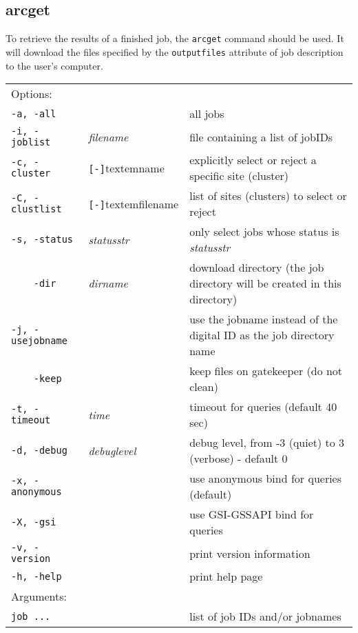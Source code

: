 \subsection{arcget}
\label{sec:arcget}

To retrieve the results of a finished job, the \texttt{arcget}
 command should be used. It
will download the files specified by the \texttt{outputfiles}
attribute of job description to the user's computer.

\hspace*{0.5cm}
\begin{shaded}
\end{shaded}
\begin{longtable}{llp{8cm}}
   Options:&&\\
   \texttt{-a, -all}& & all jobs\\
   \texttt{-i, -joblist}& \textit{filename} & file containing a list of jobIDs\\
   \texttt{-c, -cluster}&\verb#[-]#textem{name}&explicitly select or reject a specific site (cluster)\\
   \texttt{-C, -clustlist}&\verb#[-]#textem{filename}&list of sites (clusters) to select or reject\\
   \texttt{-s, -status}& \textit{statusstr} &only select jobs whose status is \textit{statusstr}\\
   \texttt{~~~~-dir} & \textit{dirname} & download directory (the job directory will be created in this directory)\\
   \texttt{-j, -usejobname}& & use the jobname instead of the digital ID as the job directory name\\
   \texttt{~~~~-keep}& & keep files on gatekeeper (do not clean)\\
   \texttt{-t, -timeout}& \textit{time} & timeout for queries (default 40 sec)\\
   \texttt{-d, -debug}& \textit{debuglevel} &debug level, from -3 (quiet) to 3 (verbose) - default 0\\
   \texttt{-x, -anonymous}& & use anonymous bind for queries (default)\\
   \texttt{-X, -gsi}& & use GSI-GSSAPI bind for queries\\
   \texttt{-v, -version}& & print version information\\
   \texttt{-h, -help}& & print help page\\
   Arguments:&&\\
   \texttt{job ...} && list of job IDs and/or jobnames\\
\end{longtable}

